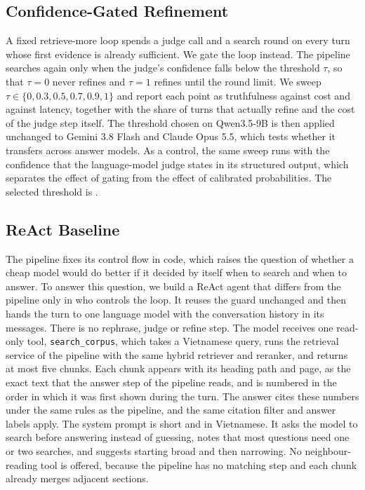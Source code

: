 \subsection{Confidence-Gated Refinement}\label{sec:gating}

A fixed retrieve-more loop spends a judge call and a search round on every turn whose first evidence is already sufficient. We gate the loop instead. The pipeline searches again only when the judge's confidence falls below the threshold $\tau$, so that $\tau=0$ never refines and $\tau=1$ refines until the round limit. We sweep $\tau\in\{0,0.3,0.5,0.7,0.9,1\}$ and report each point as truthfulness against cost and against latency, together with the share of turns that actually refine and the cost of the judge step itself. %
The threshold chosen on Qwen3.5-9B is then applied unchanged to Gemini 3.8 Flash and Claude Opus 5.5, which tests whether it transfers across answer models. As a control, the same sweep runs with the confidence that the language-model judge states in its structured output, which separates the effect of gating from the effect of calibrated probabilities. The selected threshold is .

\subsection{ReAct Baseline}\label{sec:react}

The pipeline fixes its control flow in code, which raises the question of whether a cheap model would do better if it decided by itself when to search and when to answer. %
To answer this question, we build a ReAct agent that differs from the pipeline only in who controls the loop. It reuses the guard unchanged and then hands the turn to one language model with the conversation history in its messages. There is no rephrase, judge or refine step. The model receives one read-only tool, \texttt{search\_corpus}, which takes a Vietnamese query, runs the retrieval service of the pipeline with the same hybrid retriever and reranker, and returns at most five chunks. Each chunk appears with its heading path and page, as the exact text that the answer step of the pipeline reads, and is numbered in the order in which it was first shown during the turn. The answer cites these numbers under the same rules as the pipeline, and the same citation filter and answer labels apply. The system prompt is short and in Vietnamese. It asks the model to search before answering instead of guessing, notes that most questions need one or two searches, and suggests starting broad and then narrowing. No neighbour-reading tool is offered, because the pipeline has no matching step and each chunk already merges adjacent sections.

